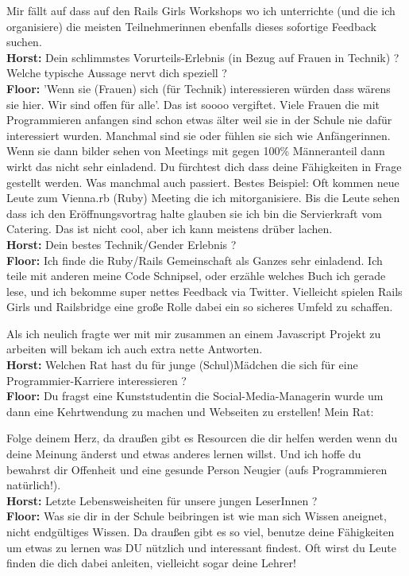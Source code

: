Mir fällt auf dass auf den Rails Girls Workshops wo ich unterrichte (und die ich organisiere) die meisten Teilnehmerinnen ebenfalls dieses sofortige Feedback suchen. \\
\textbf{Horst:} Dein schlimmstes Vorurteils-Erlebnis (in Bezug auf Frauen in Technik) ? Welche typische Aussage nervt dich speziell ? \\
\textbf{Floor:} 'Wenn sie (Frauen) sich (für Technik) interessieren würden dass wärens sie hier. Wir sind offen für alle'. Das ist soooo vergiftet. Viele Frauen die mit Programmieren anfangen sind schon etwas älter weil sie in der Schule nie dafür interessiert wurden. Manchmal sind sie oder fühlen sie sich wie Anfängerinnen. Wenn sie dann bilder sehen von Meetings mit gegen 100\% Männeranteil dann wirkt das nicht sehr einladend. Du fürchtest dich dass deine Fähigkeiten in Frage gestellt werden. Was manchmal auch passiert. Bestes Beispiel: Oft kommen neue Leute zum Vienna.rb (Ruby) Meeting die ich mitorganisiere. Bis die Leute sehen dass ich den Eröffnungsvortrag halte glauben sie ich bin die Servierkraft vom Catering. Das ist nicht cool, aber ich kann meistens drüber lachen. \\
\textbf{Horst:}  Dein bestes Technik/Gender Erlebnis ? \\
\textbf{Floor:} Ich finde die Ruby/Rails Gemeinschaft als Ganzes sehr einladend. Ich teile mit anderen meine Code Schnipsel, oder erzähle welches Buch ich gerade lese, und ich bekomme super nettes Feedback via Twitter. Vielleicht spielen Rails Girls und Railsbridge eine große Rolle dabei ein so sicheres Umfeld zu schaffen.

Als ich neulich fragte wer mit mir zusammen an einem Javascript Projekt zu arbeiten will bekam ich auch extra nette Antworten. \\
\textbf{Horst:} Welchen Rat hast du für junge (Schul)Mädchen die sich für eine Programmier-Karriere interessieren ? \\
\textbf{Floor:} Du fragst eine Kunststudentin die Social-Media-Managerin wurde um dann eine Kehrtwendung zu machen und Webseiten zu erstellen! Mein Rat: 

Folge deinem Herz, da draußen gibt es Resourcen die dir helfen werden wenn du deine Meinung änderst und etwas anderes lernen willst. Und ich hoffe du bewahrst dir Offenheit und eine gesunde Person Neugier (aufs Programmieren natürlich!). \\
\textbf{Horst:} Letzte Lebensweisheiten für unsere jungen LeserInnen ? \\
\textbf{Floor:} Was sie dir in der Schule beibringen ist wie man sich Wissen aneignet, nicht endgültiges Wissen. Da draußen gibt es so viel, benutze deine Fähigkeiten um etwas zu lernen was DU nützlich und interessant findest. Oft wirst du Leute finden die dich dabei anleiten, vielleicht sogar deine Lehrer!

